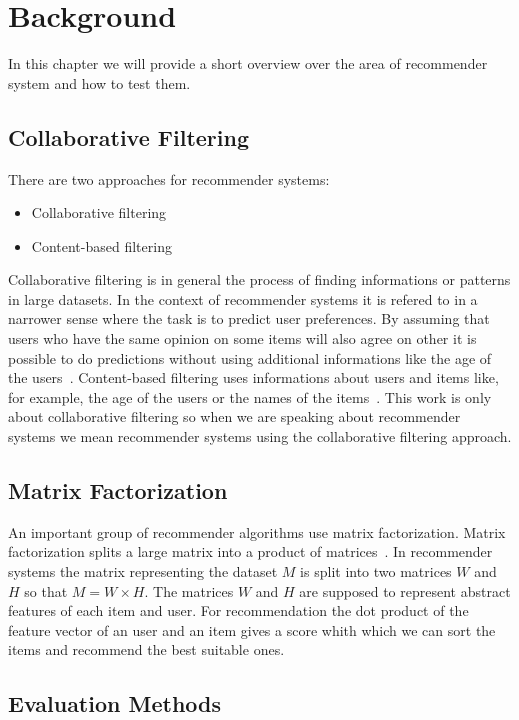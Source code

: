 
\chapter{Background}
\label{background}
In this chapter we will provide a short overview over the 
area of recommender system and how to test them.


\section{Collaborative Filtering}
There are two approaches for recommender systems:
\begin{itemize}
\item Collaborative filtering
\item Content-based filtering
\end{itemize}
Collaborative filtering is in general the process of finding 
informations or patterns in large datasets.
In the context of recommender systems 
it is refered to in a narrower sense where the task
is to predict user preferences. By assuming that users who 
have the same opinion on some items will also agree on other it is
possible to do predictions without using additional informations like the age of 
the users~\cite{collaborativefiltering}.
Content-based filtering uses informations about users and items
like, for example, the age of the users or the names of the items~\cite{contentbasedfiltering}.
This work is only about collaborative filtering so when we are 
speaking about recommender systems we mean recommender systems
using the collaborative filtering approach.


\section{Matrix Factorization}
\label{matrixfactorization}
An important group of recommender algorithms use matrix factorization. 
Matrix factorization splits a large matrix into a product of matrices~\cite{matrixfactorization}.
In recommender systems the matrix representing the dataset \(M\) is split into
two matrices \(W\) and \(H\) so that \(M = W \times H\).
The matrices \(W\) and \(H\) are supposed to represent abstract
features of each item and user. For recommendation the dot product
of the feature vector of an user and an item gives a score whith which
we can sort the items and recommend the best suitable ones. 


\section{Evaluation Methods}

